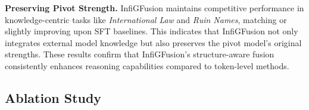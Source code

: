 \documentclass{article}
\begin{document}
\textbf{Preserving Pivot Strength.}
InfiGFusion maintains competitive performance in knowledge-centric tasks like \textit{International Law} and \textit{Ruin Names}, matching or slightly improving upon SFT baselines. This indicates that InfiGFusion not only integrates external model knowledge but also preserves the pivot model’s original strengths. These results confirm that InfiGFusion’s structure-aware fusion consistently enhances reasoning capabilities compared to token-level methods.



\subsection{Ablation Study}

\begin{table}
\renewcommand\arraystretch{1.2}
\setlength{\tabcolsep}{4.5pt}
\begin{center}
\Huge
\vspace{-2em}
\vspace{-0.3em}
\caption{\footnotesize Ablation study on model diversity. Qc, Qi, and M mean Qwen-Coder, Qwen-Instruct, and Mistral.}
\label{tab:diversity}
\end{center}
\vspace{-1.5em}
\end{table}
\end{document}
